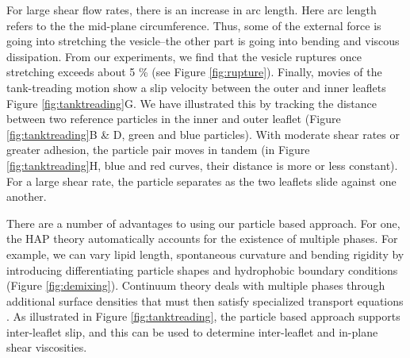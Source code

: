 For large shear flow rates, there is an increase in arc length. Here arc length
refers to the the mid-plane circumference. Thus,
some of the external force is going into stretching the vesicle--the other
part is going into bending and viscous dissipation. From our experiments, 
we find that the vesicle ruptures once stretching exceeds about 5 \%
(see Figure \ref{fig:rupture}).
Finally, movies of the tank-treading motion show a slip velocity
between the outer and inner leaflets Figure \ref{fig:tanktreading}G. We have illustrated this 
by tracking the distance between two reference particles in the inner and outer leaflet
(Figure \ref{fig:tanktreading}B \& D, green and blue particles). 
With moderate shear rates or greater adhesion, the particle pair moves in tandem
(in Figure \ref{fig:tanktreading}H, blue and red curves, their distance is more or less constant). 
For a large shear rate, the particle separates as the two leaflets slide against one another. 



There are a number of advantages to using our particle based approach.
For one, the HAP theory automatically accounts for the existence of multiple phases. 
For example, we can vary lipid length, spontaneous curvature and bending rigidity 
by introducing differentiating particle shapes and hydrophobic boundary conditions (Figure \ref{fig:demixing}).
Continuum theory deals with multiple phases through additional surface densities that must
then satisfy specialized transport equations \cite{Lowengrub07,MikuckiZhou17}. 
As illustrated in Figure \ref{fig:tanktreading}, the particle
based approach supports inter-leaflet slip, and this can be used to determine inter-leaflet
and in-plane shear viscosities. 
%




